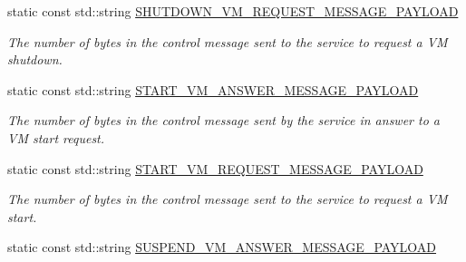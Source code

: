 \begin{DoxyCompactItemize}
\mbox{\label{classwrench_1_1_cloud_service_message_payload_a2270e6fb3b1a4b583602bcb19877c3ee}} 
static const std\+::string \hyperlink{classwrench_1_1_cloud_service_message_payload_a2270e6fb3b1a4b583602bcb19877c3ee}{S\+H\+U\+T\+D\+O\+W\+N\+\_\+\+V\+M\+\_\+\+R\+E\+Q\+U\+E\+S\+T\+\_\+\+M\+E\+S\+S\+A\+G\+E\+\_\+\+P\+A\+Y\+L\+O\+AD}
\begin{DoxyCompactList}\small\item\em The number of bytes in the control message sent to the service to request a VM shutdown. \end{DoxyCompactList}\item 
\mbox{\label{classwrench_1_1_cloud_service_message_payload_aa4bcd8c64fc1518561b9537158205a76}} 
static const std\+::string \hyperlink{classwrench_1_1_cloud_service_message_payload_aa4bcd8c64fc1518561b9537158205a76}{S\+T\+A\+R\+T\+\_\+\+V\+M\+\_\+\+A\+N\+S\+W\+E\+R\+\_\+\+M\+E\+S\+S\+A\+G\+E\+\_\+\+P\+A\+Y\+L\+O\+AD}
\begin{DoxyCompactList}\small\item\em The number of bytes in the control message sent by the service in answer to a VM start request. \end{DoxyCompactList}\item 
\mbox{\label{classwrench_1_1_cloud_service_message_payload_ac7663bdc3b3a6baf5a994d606e80c1cc}} 
static const std\+::string \hyperlink{classwrench_1_1_cloud_service_message_payload_ac7663bdc3b3a6baf5a994d606e80c1cc}{S\+T\+A\+R\+T\+\_\+\+V\+M\+\_\+\+R\+E\+Q\+U\+E\+S\+T\+\_\+\+M\+E\+S\+S\+A\+G\+E\+\_\+\+P\+A\+Y\+L\+O\+AD}
\begin{DoxyCompactList}\small\item\em The number of bytes in the control message sent to the service to request a VM start. \end{DoxyCompactList}\item 
\mbox{\label{classwrench_1_1_cloud_service_message_payload_ac31b4af8992603feaf301ba46f82a44b}} 
static const std\+::string \hyperlink{classwrench_1_1_cloud_service_message_payload_ac31b4af8992603feaf301ba46f82a44b}{S\+U\+S\+P\+E\+N\+D\+\_\+\+V\+M\+\_\+\+A\+N\+S\+W\+E\+R\+\_\+\+M\+E\+S\+S\+A\+G\+E\+\_\+\+P\+A\+Y\+L\+O\+AD}

\end{DoxyCompactItemize}
